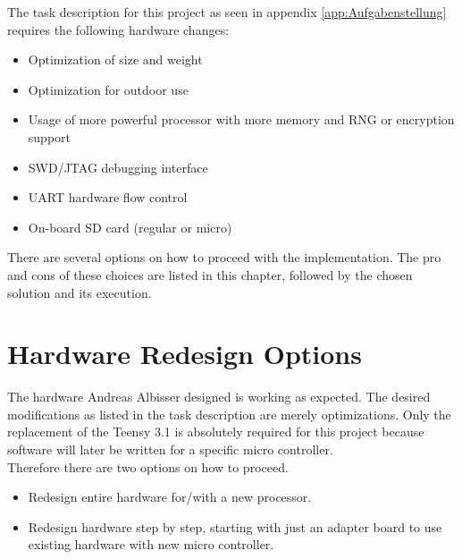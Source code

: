 %
The task description for this project as seen in appendix \autoref{app:Aufgabenstellung} requires the following hardware changes:
%
\begin{itemize}%
    \item Optimization of size and weight %
    \item Optimization for outdoor use%
    \item Usage of more powerful processor with more memory and RNG or encryption support %
    \item SWD/JTAG debugging interface%
    \item UART hardware flow control
    \item On-board SD card (regular or micro)
\end{itemize}%
%
There are several options on how to proceed with the implementation. The pro and cons of these choices are listed in this chapter, followed by the chosen solution and its execution.
%
%
%
\section{Hardware Redesign Options}
The hardware Andreas Albisser designed is working as expected. The desired modifications as listed in the task description are merely optimizations. Only the replacement of the Teensy 3.1 is absolutely required for this project because software will later be written for a specific micro controller. \\
Therefore there are two options on how to proceed.\\
%
\begin{itemize}
    \item Redesign entire hardware for/with a new processor.
    \item Redesign hardware step by step, starting with just an adapter board to use existing hardware with new micro controller.
\end{itemize}
%
